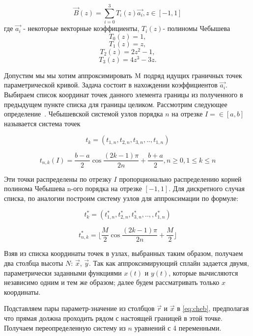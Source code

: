 \documentclass[a4paper,12pt]{report}
\begin{document}
\begin{equation} \label{eq:cheb} 
\overrightarrow{B}\left(z\right)=\sum^3_{i=0}{T_i(z)\overrightarrow{a_i}},      z\in [-1,1]
\end{equation}
где $\overrightarrow{a_i}$ - некоторые векторные коэффициенты, $T_i(z)$- полиномы Чебышева 
\[T_0\left(z\right)=1,\] 
\[T_1\left(z\right)=z,\] 
\[T_2\left(z\right)=2z^2-1,\] 
\[T_3\left(z\right)=4z^3-3z.\] 

Допустим мы мы хотим аппроксимировать ${\rm M}$ подряд идущих граничных точек параметрической кривой. Задача состоит в нахождении коэффициентов $\overrightarrow{a_i}$. Выбираем список координат точек данного элемента границы из полученного в предыдущем пункте списка для границы целиком.
Рассмотрим следующее определение~\cite{shokurov}. Чебышевской системой узлов порядка $n$ на отрезке $I=\in[a,b]$ называется система точек

\begin{equation} \label{eq:cheb node sist} 
t_k=(t_{1,n},t_{2,n},t_{3,n},..,t_{1,n})
\end{equation} 

\[t_{n,k}(I)=\frac{b-a}{2}\cos{\frac{(2k-1)\pi}{2n}+\frac{b+a}{2}}, n\geq0, 1\leq{k}\leq{n}\] 

Эти точки распределены по отрезку $I$ пропорционально распределению корней полинома Чебышева n-ого порядка на отрезке $[-1,1]$. Для дискретного случая списка, по аналогии построим систему узлов для аппроксимации по формуле:

\begin{equation} \label{eq:dis cheb node sist} 
t^*_k=(t^*_{1,n},t^*_{2,n},t^*_{3,n},..,,t^*_{1,n})
\end{equation} 

\[t^*_{n,k}=\lfloor\frac{M}{2}\cos{\frac{(2k-1)\pi}{2n}+\frac{M}{2}}\rfloor\] 

Взяв из списка координаты точек в узлах, выбранных таким образом, получаем два столбца высоты $N$: $\overrightarrow{x}$, $\overrightarrow{y}$. Так как аппроксимирующий сплайн задается двумя, параметрически заданными функциями $x(t)$ и $y(t)$, которые вычисляются независимо одним и тем же образом; далее будем рассматривать только $x$ координаты.

Подставляем пары параметр-значение из столбцов $\overrightarrow{r}$ и $\overrightarrow{x}$ в \ref{eq:cheb}, предполагая что прямая должна проходить рядом с настоящей границей в этой точке. Получаем переопределенную систему из $n$ уравнений с 4 переменными.
 
\end{document}
